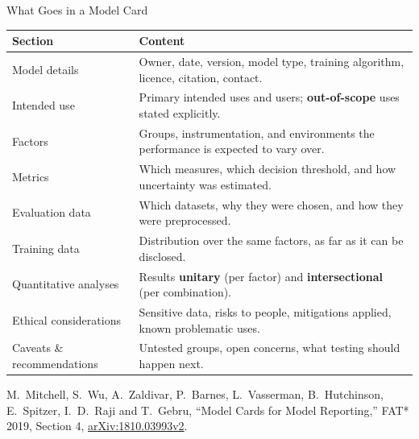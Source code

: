 \begin{frame}{What Goes in a Model Card}

    \centering
    \scriptsize
    \begin{tabular}{p{3.2cm} p{8.6cm}}
        \toprule
        \textbf{Section} & \textbf{Content} \\
        \midrule
        Model details      & Owner, date, version, model type, training algorithm, licence, citation, contact. \\
        Intended use       & Primary intended uses and users; \textbf{out-of-scope} uses stated explicitly. \\
        Factors            & Groups, instrumentation, and environments the performance is expected to vary over. \\
        Metrics            & Which measures, which decision threshold, and how uncertainty was estimated. \\
        Evaluation data    & Which datasets, why they were chosen, and how they were preprocessed. \\
        Training data      & Distribution over the same factors, as far as it can be disclosed. \\
        Quantitative analyses & Results \textbf{unitary} (per factor) and \textbf{intersectional} (per combination). \\
        Ethical considerations & Sensitive data, risks to people, mitigations applied, known problematic uses. \\
        Caveats \& recommendations & Untested groups, open concerns, what testing should happen next. \\
        \bottomrule
    \end{tabular}

    \vspace{0.9em}
    \raggedright
    {\scriptsize M.~Mitchell, S.~Wu, A.~Zaldivar, P.~Barnes, L.~Vasserman, B.~Hutchinson, E.~Spitzer,
    I.~D.~Raji and T.~Gebru, ``Model Cards for Model Reporting,'' FAT* 2019, Section 4,
    \href{https://arxiv.org/abs/1810.03993v2}{arXiv:1810.03993v2}.}
\end{frame}
